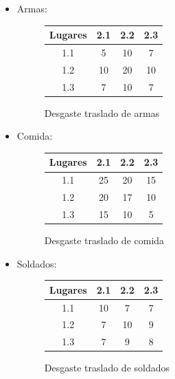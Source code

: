 \documentclass[a4paper,10pt,twocolumn]{article}
\theoremstyle{theorem}
\theoremstyle{definition}
\theoremstyle{remark}
\begin{document}
\begin{itemize}

\item Armas:

\begin{figure}[h!]%
	\begin{center}
		\begin{tabular}{|c|c|c|c|} \hline
		Lugares	& 2.1		& 2.2		& 2.3	\\ \hline
		1.1		& 5			& 10		&  7	\\ \hline
		1.2		& 10		& 20		& 10	\\ \hline
		1.3		& 7			& 10		&  7	\\ \hline
		\end{tabular}
	\caption{Desgaste traslado de armas}\label{fig:ejer_4_1}
	\end{center}
\end{figure}

\item Comida:

\begin{figure}[h!]%
	\begin{center}
		\begin{tabular}{|c|c|c|c|} \hline
		Lugares	& 2.1		& 2.2		& 2.3	\\ \hline
		1.1		& 25		& 20		& 15	\\ \hline
		1.2		& 20		& 17		& 10	\\ \hline
		1.3		& 15		& 10		&  5	\\ \hline
		\end{tabular}
	\caption{Desgaste traslado de comida}\label{fig:ejer_4_2}
	\end{center}
\end{figure}

\item Soldados:

\begin{figure}[h!]%
	\begin{center}
		\begin{tabular}{|c|c|c|c|} \hline
		Lugares	& 2.1		& 2.2		& 2.3	\\ \hline
		1.1		& 10		&  7		&  7	\\ \hline
		1.2		&  7		& 10		&  9	\\ \hline
		1.3		&  7		&  9		&  8	\\ \hline
		\end{tabular}
	\caption{Desgaste traslado de soldados}\label{fig:ejer_4_3}
	\end{center}
\end{figure}


\end{itemize}
\end{document}
